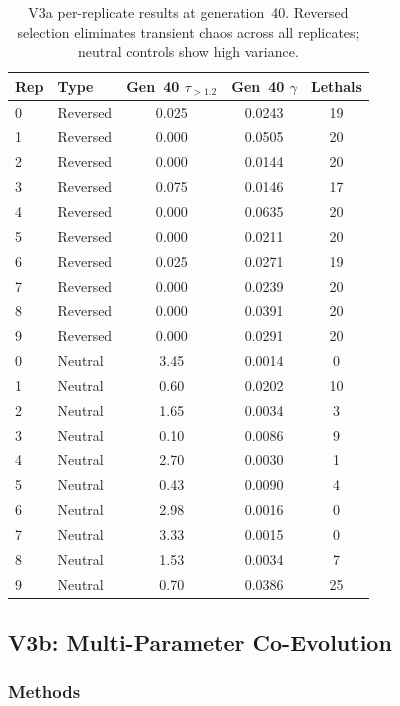 \documentclass[twocolumn,showpacs,preprintnumbers,amsmath,amssymb,prd,floatfix]{revtex4-2}
\newcommand{\tauexp}{\tau_{>1.2}}
\begin{document}
\begin{table}[b]
\centering
\caption{V3a per-replicate results at generation~40. Reversed selection eliminates transient chaos across all replicates; neutral controls show high variance.}
\label{tab:v3a_results}
\begin{tabular}{llccc}
\toprule
Rep & Type & Gen~40 $\tauexp$ & Gen~40 $\gamma$ & Lethals \\
\midrule
0  & Reversed & 0.025 & 0.0243 & 19 \\
1  & Reversed & 0.000 & 0.0505 & 20 \\
2  & Reversed & 0.000 & 0.0144 & 20 \\
3  & Reversed & 0.075 & 0.0146 & 17 \\
4  & Reversed & 0.000 & 0.0635 & 20 \\
5  & Reversed & 0.000 & 0.0211 & 20 \\
6  & Reversed & 0.025 & 0.0271 & 19 \\
7  & Reversed & 0.000 & 0.0239 & 20 \\
8  & Reversed & 0.000 & 0.0391 & 20 \\
9  & Reversed & 0.000 & 0.0291 & 20 \\
\midrule
0  & Neutral  & 3.45 & 0.0014 & 0 \\
1  & Neutral  & 0.60 & 0.0202 & 10 \\
2  & Neutral  & 1.65 & 0.0034 & 3 \\
3  & Neutral  & 0.10 & 0.0086 & 9 \\
4  & Neutral  & 2.70 & 0.0030 & 1 \\
5  & Neutral  & 0.43 & 0.0090 & 4 \\
6  & Neutral  & 2.98 & 0.0016 & 0 \\
7  & Neutral  & 3.33 & 0.0015 & 0 \\
8  & Neutral  & 1.53 & 0.0034 & 7 \\
9  & Neutral  & 0.70 & 0.0386 & 25 \\
\bottomrule
\end{tabular}
\end{table}

\subsection{V3b: Multi-Parameter Co-Evolution}
\label{sec:v3b}

\subsubsection{Methods}
\end{document}
